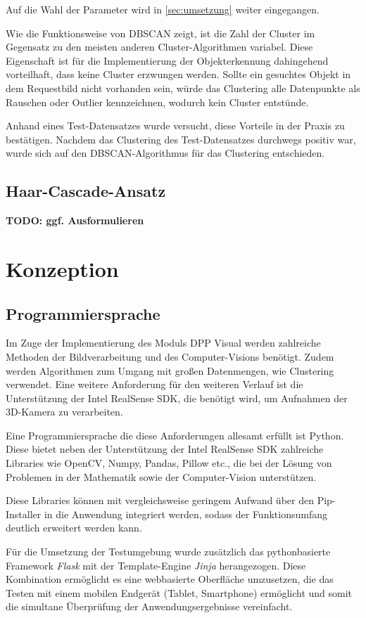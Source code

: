 \documentclass[
    type=Projektarbeit,
    status=draft, %
    language=german, %
    bibengine=bibtex,
]{unibwm-inf-thesis}
\newcommand{\todo}[1]{\textbf{TODO: #1}}
\begin{document}
    Auf die Wahl der Parameter wird in \autoref{sec:umsetzung} weiter eingegangen.

    Wie die Funktionsweise von DBSCAN zeigt, ist die Zahl der Cluster im Gegensatz zu den meisten anderen Cluster-Algorithmen variabel.
    Diese Eigenschaft ist für die Implementierung der Objekterkennung dahingehend vorteilhaft, dass keine Cluster \glqq erzwungen\grqq{} werden.
    Sollte ein gesuchtes Objekt in dem Requestbild nicht vorhanden sein, würde das Clustering alle Datenpunkte als Rauschen oder Outlier kennzeichnen, wodurch kein Cluster entstünde.

    Anhand eines Test-Datensatzes wurde versucht, diese Vorteile in der Praxis zu bestätigen.
    Nachdem das Clustering des Test-Datensatzes durchwegs positiv war, wurde sich auf den DBSCAN-Algorithmus für das Clustering entschieden.

    \subsection{Haar-Cascade-Ansatz}
    \todo{ggf. Ausformulieren}
    
    \section{Konzeption}
    \subsection{Programmiersprache}
    Im Zuge der Implementierung des Moduls DPP Visual werden zahlreiche Methoden der Bildverarbeitung und des
    Computer-Visions benötigt.
    Zudem werden Algorithmen zum Umgang mit großen Datenmengen, wie Clustering verwendet.
    Eine weitere Anforderung für den weiteren Verlauf ist die Unterstützung der Intel RealSense SDK, die benötigt wird,
    um Aufnahmen der 3D-Kamera zu verarbeiten.

    Eine Programmiersprache die diese Anforderungen allesamt erfüllt ist Python.
    Diese bietet neben der Unterstützung der Intel RealSense SDK zahlreiche Libraries wie OpenCV, Numpy, Pandas,
    Pillow etc., die bei der Lösung von Problemen in der Mathematik sowie der Computer-Vision unterstützen.

    Diese Libraries können mit vergleichsweise geringem Aufwand über den Pip-Installer in die Anwendung integriert
    werden, sodass der Funktionsumfang deutlich erweitert werden kann.

    Für die Umsetzung der Testumgebung wurde zusätzlich das pythonbasierte Framework \textit{Flask} mit der
    Template-Engine \textit{Jinja} herangezogen.
    Diese Kombination ermöglicht es eine webbasierte Oberfläche umzusetzen, die das Testen mit einem mobilen Endgerät
    (Tablet, Smartphone) ermöglicht und somit die simultane Überprüfung der Anwendungsergebnisse vereinfacht.
\end{document}
